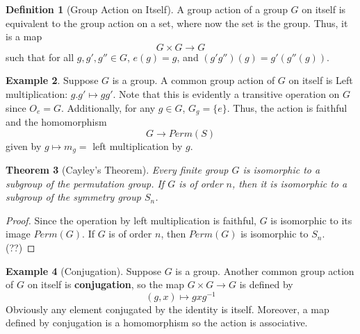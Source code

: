 \documentclass[12pt]{article}
\newtheorem{thm}{Theorem}[section]
\theoremstyle{definition}
\newtheorem{defn}[thm]{Definition}
\newtheorem{eg}[thm]{Example}
\theoremstyle{remark}
\numberwithin{equation}{section}
\newcommand\B[1]{\textbf{ #1}}
\begin{document}
\begin{defn}[Group Action on Itself]
        A group action of a group $G$ on itself is equivalent to the group action on a set, where now the set is the group. Thus, it is a map \begin{equation}
                G\times G \rightarrow G
        \end{equation}
        such that for all $g,g',g'' \in G$, $e(g) = g$, and $(g'g'')(g) = g'(g''(g))$.
\end{defn}

\vspace{15pt}


\begin{eg}
        Suppose $G$ is a group. A common group action of $G$ on itself is Left multiplication: $g.g' \mapsto gg'$. Note that this is evidently a transitive operation on $G$ since $O_e = G$. Additionally, for any $g \in G$, $G_g = \{e\}$. Thus, the action is faithful and the homomorphism \begin{equation}
                        G\rightarrow Perm(S)
        \end{equation} 
        given by $g\mapsto m_g = $ left multiplication by $g$.
\end{eg}


\vspace{15pt}

\begin{thm}[Cayley's Theorem]
        Every finite group $G$ is isomorphic to a subgroup of the permutation group. If $G$ is of order $n$, then it is isomorphic to a subgroup of the symmetry group $S_n$.
\end{thm}
\begin{proof}
        Since the operation by left multiplication is faithful, $G$ is isomorphic to its image $Perm(G)$. If $G$ is of order $n$, then $Perm(G)$ is isomorphic to $S_n$. (??)
\end{proof}

\vspace{15pt}

\begin{eg}[Conjugation]
        Suppose $G$ is a group. Another common group action of $G$ on itself is \B{conjugation}, so the map $G\times G\rightarrow G$ is defined by \begin{equation}
                (g,x) \mapsto gxg^{-1}
        \end{equation}
        Obviously any element conjugated by the identity is itself. Moreover, a map defined by conjugation is a homomorphism so the action is associative.
\end{eg}
\end{document}
